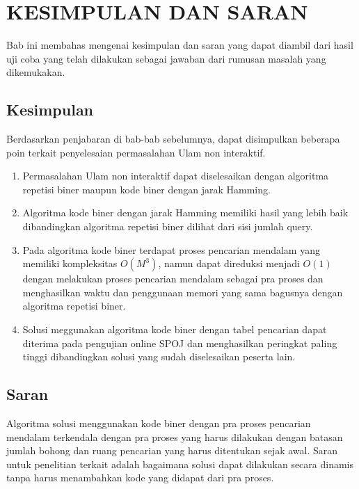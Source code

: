 \chapter{KESIMPULAN DAN SARAN}

Bab ini membahas mengenai kesimpulan dan saran yang dapat diambil dari hasil uji coba yang telah dilakukan sebagai jawaban dari rumusan masalah yang dikemukakan.

\section{Kesimpulan}


Berdasarkan penjabaran di bab-bab sebelumnya, dapat disimpulkan beberapa poin terkait penyelesaian permasalahan Ulam non interaktif.

\begin{enumerate}
	\item Permasalahan Ulam non interaktif dapat diselesaikan dengan algoritma repetisi biner maupun kode biner dengan jarak Hamming.
	\item Algoritma kode biner dengan jarak Hamming memiliki hasil yang lebih baik dibandingkan algoritma repetisi biner dilihat dari sisi jumlah query.
	\item Pada algoritma kode biner terdapat proses pencarian mendalam yang memiliki kompleksitas $O(M^3)$, namun dapat direduksi menjadi $O(1)$ dengan melakukan proses pencarian mendalam sebagai pra proses dan menghasilkan waktu dan penggunaan memori yang sama bagusnya dengan algoritma repetisi biner.
	\item Solusi meggunakan algoritma kode biner dengan tabel pencarian dapat diterima pada pengujian online SPOJ dan menghasilkan peringkat paling tinggi dibandingkan solusi yang sudah diselesaikan peserta lain.
\end{enumerate}

\section{Saran}

Algoritma solusi menggunakan kode biner dengan pra proses pencarian mendalam terkendala dengan pra proses yang harus dilakukan dengan batasan jumlah bohong dan ruang pencarian yang harus ditentukan sejak awal. Saran untuk penelitian terkait adalah bagaimana solusi dapat dilakukan secara dinamis tanpa harus menambahkan kode yang didapat dari pra proses.
